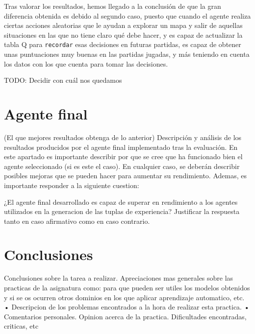 \documentclass[12pt]{article}
\begin{document}
Tras valorar los resultados, hemos llegado a la conclusión de que la gran diferencia obtenida es debido al segundo caso, puesto que cuando el agente realiza ciertas acciones aleatorias que le ayudan a explorar un mapa y salir de aquellas situaciones en las que no tiene claro qué debe hacer, y es capaz de actualizar la tabla Q para \texttt{recordar} esas decisiones en futuras partidas, es capaz de obtener unas puntuaciones muy buenas en las partidas jugadas, y más teniendo en cuenta los datos con los que cuenta para tomar las decisiones.

TODO: Decidir con cuál nos quedamos

\section{Agente final}
(El que mejores resultados obtenga de lo anterior)
Descripción y análisis de los resultados producidos por el agente final implementado tras la evaluación. En este apartado es importante describir por que se cree que ha funcionado bien el agente seleccionado (si es este el caso). En cualquier caso, se deberán describir posibles mejoras que se pueden hacer para aumentar su rendimiento. Ademas, es importante responder a la siguiente cuestion:
        
¿El agente final desarrollado es capaz de superar en rendimiento a los agentes utilizados en la generacion de las tuplas de experiencia? Justificar la respuesta tanto en caso afirmativo como en caso contrario.


\section{Conclusiones}
Conclusiones sobre la tarea a realizar.
Apreciaciones mas generales sobre las practicas de la asignatura como: para que pueden ser utiles los modelos obtenidos y si se os ocurren otros dominios en los que aplicar aprendizaje automatico, etc.
• Descripcion de los problemas encontrados a la hora de realizar esta practica.
• Comentarios personales. Opinion acerca de la practica. Dificultades encontradas, criticas, etc
\end{document}
